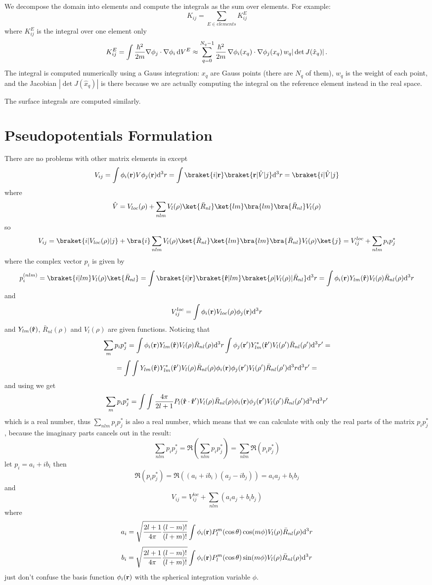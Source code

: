 We decompose the domain into elements and compute the integrals as the sum over
elements. For example:
$$K_{ij}=\sum_{E\in elements} K_{ij}^E$$
where $K_{ij}^E$ is the integral over one element only
$$
K_{ij}^{E}=\int{\hbar^2\over2m}\nabla\phi_j\cdot\nabla\phi_i\,{\rm d} V^{E}\approx
\sum_{q=0}^{N_q-1}{\hbar^2\over2m}\,\nabla\phi_i(x_q)\cdot\nabla\phi_j(x_q)\,
w_q|\det J(\hat x_q)|\,.
$$
The integral is computed numerically using a Gauss integration: $x_q$ are Gauss
points (there are $N_q$ of them), $w_q$ is the weight of each point, and the
Jacobian $|\det J(\hat x_q)|$ is there because we are actually computing the
integral on the reference element instead in the real space.

The surface integrals are computed similarly.

\section{Pseudopotentials Formulation}

There are no problems with other matrix elements in  except 
$$V_{ij}
=\int\phi_i({\bf r}) V \phi_j({\bf r}) \d^3 r
=\int\braket{i|{\bf r}} \braket{{\bf r}|\hat V|j} \d^3 r
=\braket{i|\hat V|j}
$$
where 
$$\hat V=V_{loc}(\rho)+\sum_{nlm}V_l(\rho)\ket{\bar R_{nl}}\ket{lm}
\bra{lm}\bra{\bar R_{nl}}V_l(\rho)$$
so
$$
V_{ij}=\braket{i|V_{loc}(\rho)|j}+
\bra{i}\sum_{nlm}V_l(\rho)\ket{\bar R_{nl}}\ket{lm}
\bra{lm}\bra{\bar R_{nl}}V_l(\rho) \ket{j}
=V_{ij}^{loc}+\sum_{nlm}p_ip_j^*
$$
where the complex vector $p_i$ is given by
$$p_i^{(nlm)}=\braket{i|lm}V_l(\rho)\ket{\bar R_{nl}}=
\int\braket{i|{\bf r}}\braket{{\bf\hat r}|lm}
\braket{\rho|V_l(\rho)|\bar R_{nl}}\d^3 r=
\int \phi_i({\bf r})Y_{lm}({\bf\hat r})V_l(\rho)\bar R_{nl}(\rho)\d^3 r
$$
and
$$V_{ij}^{loc}=\int\phi_i({\bf r}) V_{loc}(\rho) \phi_j({\bf r}) {\rm d}^3 r $$
and
$Y_{lm}({\bf\hat r})$, $\bar R_{nl}(\rho)$ and $V_l(\rho)$ are given functions.
Noticing that
$$\sum_m p_ip_j^*=
\int \phi_i({\bf r})Y_{lm}({\bf\hat r})V_l(\rho)\bar R_{nl}(\rho){\rm d}^3 r
\int \phi_j({\bf r'})Y_{lm}^*({\bf\hat r'})V_l(\rho')\bar R_{nl}(\rho'){\rm d}^3 r'=
$$
$$
=\int\int Y_{lm}({\bf\hat r})Y_{lm}^*({\bf\hat r'})V_l(\rho)\bar R_{nl}(\rho)
\phi_i({\bf r}) \phi_j({\bf r'})V_l(\rho')\bar R_{nl}(\rho'){\rm d}^3 r{\rm d}^3 r'=
$$
and using  we get
$$\sum_m p_ip_j^*=
\int\int {4\pi\over 2l+1}P_l({\bf\hat r}\cdot{\bf\hat r'})V_l(\rho)\bar
R_{nl}(\rho) \phi_i({\bf r}) \phi_j({\bf r'})V_l(\rho')\bar R_{nl}(\rho'){\rm d}^3
r{\rm d}^3 r'
$$
which is a real number, thus $\sum_{nlm}p_ip_j^*$ is also a real number, which
means that we can calculate with only the real parts of the matrix $p_ip_j^*$,
because the imaginary parts cancels out in the result:
$$\sum_{nlm}p_ip_j^*=\Re\left(\sum_{nlm}p_ip_j^*\right)=
\sum_{nlm}\Re(p_ip_j^*)$$
let $p_i=a_i+ib_i$ then 
$$\Re(p_ip_j^*)=\Re((a_i+ib_i)(a_j-ib_j))=a_ia_j+b_ib_j$$
and
$$V_{ij}=V_{ij}^{loc}+\sum_{nlm}(a_ia_j+b_ib_j)$$
where
$$a_i=
\sqrt{{2l+1\over4\pi}{(l-m)!\over(l+m)!}}
\int \phi_i({\bf r})P_l^m(\cos\theta)\cos(m\phi)V_l(\rho)\bar
R_{nl}(\rho){\rm d}^3 r
$$
$$b_i=
\sqrt{{2l+1\over4\pi}{(l-m)!\over(l+m)!}}
\int \phi_i({\bf r})P_l^m(\cos\theta)\sin(m\phi)V_l(\rho)\bar
R_{nl}(\rho){\rm d}^3 r
$$
just don't confuse the basis function $\phi_i({\bf r})$ with the spherical
integration variable $\phi$.

